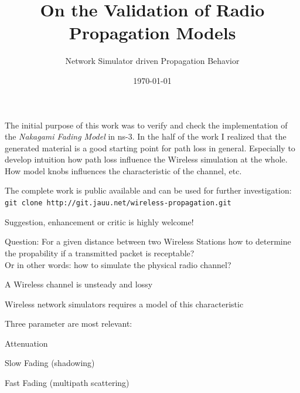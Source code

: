\documentclass[9pt]{article}
\begin{document}
\title{On the Validation of Radio Propagation Models}

\subtitle{Network Simulator driven Propagation Behavior}

\date{\today}
\maketitle

\begin{slide}
\bi
	\item The initial purpose of this work was to verify and
	      check the implementation of the \textit{Nakagami Fading Model}
		  in ns-3. In the half of the work I realized that the generated
		  material is a good starting point for path loss in general.
		  Especially to develop intuition how path loss influence the Wireless
		  simulation at the whole. How model knobs influences the
		  characteristic of the channel, etc.

	\item The complete work is public available and can be used for further
	      investigation:\newline
	      \verb+git clone http://git.jauu.net/wireless-propagation.git+

	\item Suggestion, enhancement or critic is highly welcome!
\ei
\end{slide}

\begin{slide}
\bi
	\item Question: For a given distance between two Wireless Stations
	      how to determine the propability if a transmitted packet is
		  receptable?\\
		  Or in other words: how to simulate the physical radio channel?
\ei
\end{slide}


\begin{slide}
\bi
	\item A Wireless channel is unsteady and lossy

	\item Wireless network simulators requires a model of this characteristic

	\item Three parameter are most relevant:

	\be
		\item Attenuation
		\item Slow Fading (shadowing)
		\item Fast Fading (multipath scattering)
	\ee
\ei
\end{slide}
\end{document}
